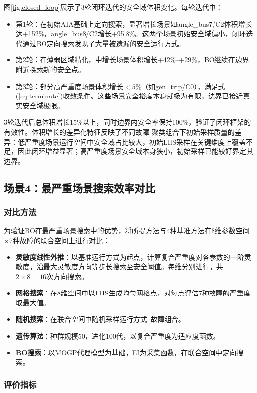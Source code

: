 图\ref{fig:closed_loop}展示了3轮闭环迭代的安全域体积变化。每轮迭代中：
\begin{itemize}
    \item 第1轮：在初始AIA基础上定向搜索，显著增长场景如angle\_bus7/C2体积增长达+152\%，angle\_bus8/C2增长+95.8\%。这两个场景初始安全域偏小，闭环迭代通过BO定向搜索发现了大量被遗漏的安全运行方式。
    \item 第2轮：在薄弱区域精化，中增长场景体积增长+42\%--+29\%，BO继续在边界附近探索新的安全点。
    \item 第3轮：部分高严重度场景体积增长$<5\%$（如gen\_trip/C0），满足式(\ref{eq:terminate})收敛条件。这些场景安全裕度本身就极为有限，边界已接近真实安全域极限。
\end{itemize}

3轮迭代后总体积增长15\%以上，同时边界内安全率保持100\%，验证了闭环框架的有效性。体积增长的差异化特征反映了不同故障-聚类组合下初始采样质量的差异：低严重度场景运行空间中安全域占比较大，初始LHS采样在关键维度上覆盖不足，因此闭环增益显著；高严重度场景安全域本身狭小，初始采样已能较好界定其边界。

\subsection{场景4：最严重场景搜索效率对比}
\FloatBarrier

\subsubsection{对比方法}

为验证BO在最严重场景搜索中的优势，将所提方法与4种基准方法在8维参数空间$\times$7种故障的联合空间上进行对比：
\begin{itemize}
    \item \textbf{灵敏度线性外推}：以基准运行方式为起点，计算复合严重度对各参数的一阶灵敏度，沿最大灵敏度方向等步长搜索至安全阈值。每维分别进行，共$2 \times 8 = 16$次方向搜索。
    \item \textbf{网格搜索}：在8维空间中以LHS生成均匀网格点，对每点评估7种故障的严重度取最大值。
    \item \textbf{随机搜索}：在联合空间中随机采样运行方式--故障组合。
    \item \textbf{遗传算法}：种群规模50，进化100代，以复合严重度为适应度函数。
    \item \textbf{BO搜索}：以MOGP代理模型为基础，EI为采集函数，在联合空间中定向搜索。
\end{itemize}

\subsubsection{评价指标}


